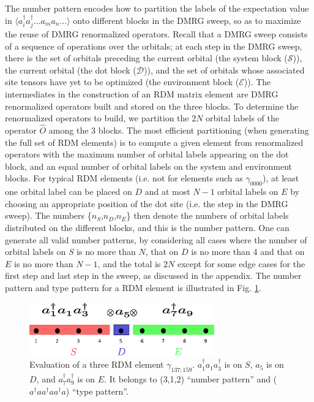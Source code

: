 The number pattern encodes how to partition the labels of the expectation value in $\langle a^\dagger_i a^\dagger_j\dots a_m a_n\dots \rangle$ onto different blocks in the DMRG sweep, so as to maximize the reuse of DMRG renormalized operators.
Recall that a DMRG sweep consists of a sequence of operations over the orbitals; at each step in the DMRG sweep, there is the set of
orbitals preceding the current orbital (the system block ($\mathcal{S}$)), the current orbital (the dot block ($\mathcal{D}$)), and the set of orbitals whose
associated site tensors have yet to be optimized (the environment block ($\mathcal{E}$)). 
The intermediates in the construction of an RDM matrix element are DMRG renormalized operators  built and stored on the three blocks. 
To determine the renormalized operators to build, we partition the $2N$ orbital labels of the operator $\hat{O}$ 
among the 3 blocks. The most efficient partitioning (when generating
the full set of RDM elements) is to compute a given element from renormalized operators with
the maximum number of orbital labels appearing on the dot block, and an
equal number of  orbital labels on the system and environment blocks. 
For typical RDM elements (i.e. not for elements such as $\gamma_{0000}$), at least one orbital label can be placed on $D$ and at most $N-1$ orbital labels on $E$ by choosing an appropriate position of the dot site (i.e. the step in the DMRG sweep). 
The numbers \{$n_S$,$n_D$,$n_E$\} then denote the numbers of orbital labels distributed on the different blocks, and this
is the number pattern. One can generate all valid number patterns, by considering all cases where the number of orbital labels on $S$ is no more than $N$, that on $D$ is no more than 4 and that on $E$ is no more than $N-1$, and the total is $2N$ except for some edge cases for the first step and last step in the sweep, as discussed in the appendix.
The number pattern and type pattern for a RDM element is illustrated in Fig. \ref{fig:operator_split}. 


\begin{figure}\label{fig:operator_split}
  \includegraphics[width=8cm]{operator_split.eps}
  \caption{Evaluation of a three RDM element $\gamma_{137;159}$. $a_1^\dagger a_1 a^\dagger_3$ is on $S$, $a_5$ is on $D$, and $a^\dagger_7a^\dagger_9$ is on $E$. It belongs to (3,1,2) ``number pattern'' and ($a^\dagger a a^\dagger a a^\dagger a$) ``type pattern''.}
\end{figure}

